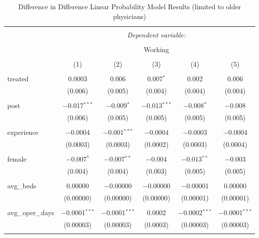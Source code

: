 
\begin{table}[!htbp] \centering 
  \caption{Difference in Difference Linear Probability Model Results (limited to older physicians)} 
  \label{} 
\begin{tabular}{@{\extracolsep{5pt}}lccccc} 
\\[-1.8ex]\hline 
\hline \\[-1.8ex] 
 & \multicolumn{5}{c}{\textit{Dependent variable:}} \\ 
\cline{2-6} 
\\[-1.8ex] & \multicolumn{5}{c}{Working} \\ 
\\[-1.8ex] & (1) & (2) & (3) & (4) & (5)\\ 
\hline \\[-1.8ex] 
 treated & 0.0003 & 0.006 & 0.007$^{*}$ & 0.002 & 0.006 \\ 
  & (0.006) & (0.005) & (0.004) & (0.004) & (0.004) \\ 
  & & & & & \\ 
 post & $-$0.017$^{***}$ & $-$0.009$^{*}$ & $-$0.013$^{***}$ & $-$0.008$^{*}$ & $-$0.008 \\ 
  & (0.006) & (0.005) & (0.005) & (0.005) & (0.005) \\ 
  & & & & & \\ 
 experience & $-$0.0004 & $-$0.001$^{***}$ & $-$0.0004 & $-$0.0003 & $-$0.0004 \\ 
  & (0.0003) & (0.0003) & (0.0002) & (0.0003) & (0.0004) \\ 
  & & & & & \\ 
 female & $-$0.007$^{*}$ & $-$0.007$^{**}$ & $-$0.004 & $-$0.013$^{**}$ & $-$0.003 \\ 
  & (0.004) & (0.004) & (0.003) & (0.005) & (0.005) \\ 
  & & & & & \\ 
 avg\_beds & 0.00000 & $-$0.00000 & $-$0.00000 & $-$0.00001 & 0.00000 \\ 
  & (0.00000) & (0.00000) & (0.00000) & (0.00001) & (0.00001) \\ 
  & & & & & \\ 
 avg\_oper\_days & $-$0.0001$^{***}$ & $-$0.0001$^{***}$ & 0.0002 & $-$0.0002$^{***}$ & $-$0.0001$^{***}$ \\ 
  & (0.00003) & (0.00003) & (0.0003) & (0.00003) & (0.00003) \\ 
  & & & & & \\ 

\end{tabular}
\end{table}
